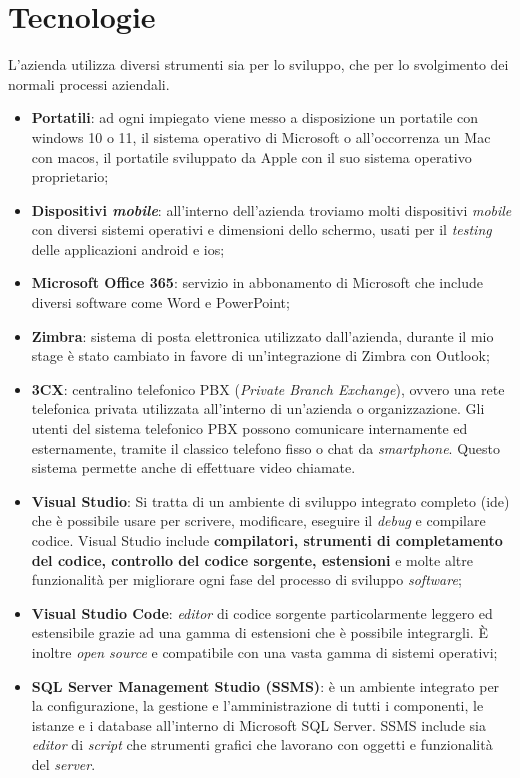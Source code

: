 \section{Tecnologie}
L'azienda utilizza diversi strumenti sia per lo sviluppo, che per lo svolgimento dei normali processi aziendali.
\begin{itemize}
    \item \textbf{Portatili}: ad ogni impiegato viene messo a disposizione un portatile con \gls{windows} 10 o 11, il sistema 
          operativo di Microsoft o all'occorrenza un Mac con \gls{macos}, il portatile sviluppato da Apple con il suo sistema operativo proprietario;
    \item \textbf{Dispositivi \textit{mobile}}: all'interno dell'azienda troviamo molti dispositivi \textit{mobile} con diversi sistemi operativi e dimensioni 
          dello schermo, usati per il \textit{testing} delle applicazioni \gls{android} e \gls{ios};
    \item \textbf{Microsoft Office 365}: servizio in abbonamento di Microsoft che include diversi software come Word e PowerPoint;
    \item \textbf{Zimbra}: sistema di posta elettronica utilizzato dall'azienda, durante il mio stage è stato cambiato in favore di un'integrazione di Zimbra 
          con Outlook;
    \item \textbf{3CX}: centralino telefonico PBX (\textit{Private Branch Exchange}), ovvero una rete telefonica privata utilizzata all'interno di un'azienda 
          o organizzazione. Gli utenti del sistema telefonico PBX possono comunicare internamente ed esternamente, tramite il classico telefono fisso o 
          chat da \textit{smartphone}. Questo sistema permette anche di effettuare video chiamate.
    \item \textbf{Visual Studio}: Si tratta di un ambiente di sviluppo integrato completo (\gls{ide}) che è possibile usare per scrivere, modificare, 
          eseguire il \textit{debug} e compilare codice. Visual Studio include \textbf{compilatori, strumenti di completamento del codice, 
          controllo del codice sorgente, estensioni} e molte altre funzionalità per migliorare ogni fase del processo di sviluppo \textit{software};
    \item \textbf{Visual Studio Code}: \textit{editor} di codice sorgente particolarmente leggero ed estensibile grazie ad una gamma di estensioni 
          che è possibile integrargli. È inoltre \textit{open source} e compatibile con una vasta gamma di sistemi operativi;
    \item \textbf{SQL Server Management Studio (SSMS)}: è un ambiente integrato per la configurazione, la gestione e l'amministrazione di tutti i componenti, 
          le istanze e i database all'interno di Microsoft SQL Server. SSMS include sia \textit{editor} di \textit{script} che strumenti grafici che lavorano con 
          oggetti e funzionalità del \textit{server}.
\end{itemize}
